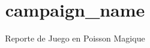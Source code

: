 \documentclass[oneside,openright,titlepage,dottedtoc,numbers=noenddot,headinclude,footinclude=true,cleardoublepage=empty,abstractoff,paper=letter,fontsize=11pt,spanish]{scrartcl}
\begin{document}

\title{{{ campaign_name }}}
\date{Reporte de Juego en Poisson Magique}
\maketitle


\end{document}
